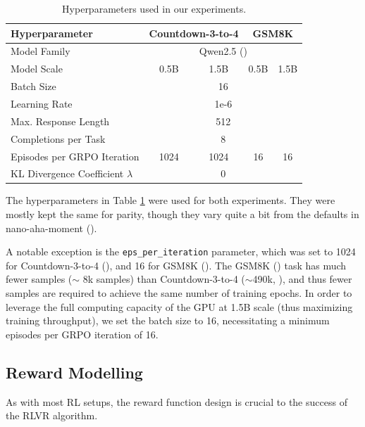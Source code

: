 \documentclass{article} %
\theoremstyle{definition}
\begin{document}
\begin{table}[h]
    \centering
    \begin{tabular}{|l|c|c|c|c|}
        \hline
        \textbf{Hyperparameter} & \multicolumn{2}{c|}{\textbf{Countdown-3-to-4}} & \multicolumn{2}{|c|}{\textbf{GSM8K}} \\
        \hline
        Model Family & \multicolumn{4}{c|}{Qwen2.5 (\cite{Qwen-et-al-2025})} \\
        \hline
        Model Scale & 0.5B & 1.5B & 0.5B & 1.5B \\
        \hline
        Batch Size & \multicolumn{4}{c|}{16} \\
        \hline
        Learning Rate & \multicolumn{4}{c|}{1e-6} \\
        \hline
        Max. Response Length & \multicolumn{4}{c|}{512} \\
        \hline
        Completions per Task & \multicolumn{4}{c|}{8} \\
        \hline
        Episodes per GRPO Iteration & 1024 & 1024 & 16 & 16\\
        \hline
        KL Divergence Coefficient $\lambda$ & \multicolumn{4}{c|}{0} \\
        \hline
    \end{tabular}
    \caption{Hyperparameters used in our experiments.}
    \label{tab:hyperparams}
\end{table}

The hyperparameters in Table \ref{tab:hyperparams} were used for both experiments.
They were mostly kept the same for parity, though they vary quite
a bit from the defaults in nano-aha-moment (\cite{nano-aha-moment}).

A notable exception is the \texttt{eps\_per\_iteration} parameter, which was set to 1024 for Countdown-3-to-4 (\cite{countdown}),
and 16 for GSM8K (\cite{gsm8k}). The GSM8K (\cite{gsm8k}) task has much fewer samples ($\sim$ 8k samples) than Countdown-3-to-4 ($\sim$490k, \cite{countdown}),
and thus fewer samples are required to achieve the same number of training epochs. In order to
leverage the full computing capacity of the GPU at 1.5B scale (thus maximizing training throughput),
we set the batch size to 16, necessitating a minimum episodes per GRPO iteration of 16.

\subsection{Reward Modelling}
As with most RL setups, the reward function design is crucial to the success of the RLVR algorithm.
\end{document}

